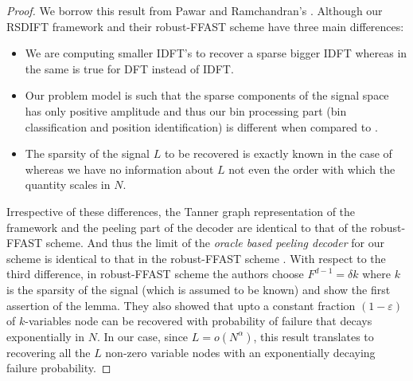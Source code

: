 \begin{proof}
We borrow this result from Pawar and Ramchandran's \cite{pawar2014robust}. Although our RSDIFT framework and their robust-FFAST scheme have three main differences:
\begin{itemize}
\item We are computing smaller IDFT's to recover a sparse bigger IDFT whereas in \cite{pawar2014robust} the same is true for DFT instead of IDFT.
\item Our problem model is such that the sparse components of the signal space has only positive amplitude and thus our bin processing part (bin classification and position identification) is different when compared to \cite{pawar2014robust}.
\item The sparsity of the signal $L$ to be recovered is exactly known in the case of \cite{pawar2014robust} whereas we have no information  about $L$ not even the order with which the quantity scales in $N$.
\end{itemize}

Irrespective of these differences, the Tanner graph representation of the framework and the peeling part of the decoder are identical to that of the robust-FFAST scheme. And thus the limit of the {\it oracle based peeling decoder} for our scheme is identical to that in the robust-FFAST scheme \cite{pawar2014robust}.  With respect to the third difference, in robust-FFAST scheme the authors choose $F^{d-1}=\delta k$ where $k$ is the sparsity of the signal (which is assumed to be known) and show the first assertion of the lemma. They also showed that upto a constant fraction $(1-\varepsilon)$ of $k$-variables node can be recovered with probability of failure that decays exponentially in $N$. In our case, since $L=o(N^{\alpha})$, this result translates to recovering all the $L$ non-zero variable nodes with an exponentially decaying failure  probability.
\end{proof}

